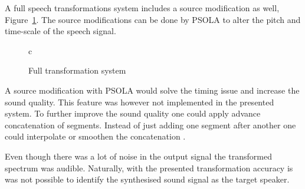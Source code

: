A full speech transformations system includes a source modification as well, Figure~\ref{fig:VC_full}. The source modifications can be done by PSOLA \cite[p.820]{taletek} to alter the pitch and time-scale  of the speech signal.
\begin{figure}[htbp]
  \centering
   \begin{tabular}[h]{c}
  \end{tabular}
  \caption{Full transformation system}
  \label{fig:VC_full}
\end{figure}
A source modification with PSOLA would solve the timing issue and increase the sound quality. This feature was however not implemented in the presented system. To further improve the sound quality one could apply advance concatenation of segments. Instead of just adding one segment after another one could interpolate or smoothen the concatenation \cite{chappell02}.

Even though there was a lot of noise in the output signal the transformed spectrum was audible. Naturally, with the presented transformation accuracy is was not possible to identify the synthesised sound signal as the target speaker.


